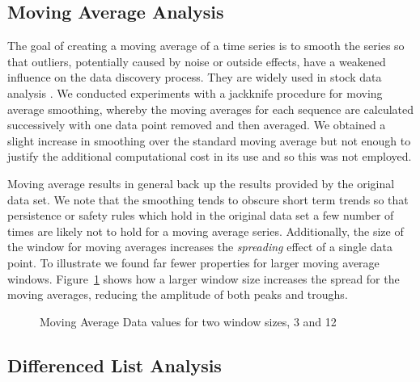 \subsection{Moving Average Analysis}\label{subsec:tr_mav_analysis}

The goal of creating a moving average of a time series is to smooth
the series so that outliers, potentially caused by noise or outside
effects, have a weakened influence on the data discovery
process. They are widely used in stock data analysis \cite{rm97}.
 We conducted experiments with a jackknife procedure for moving
average smoothing, 
whereby the moving averages for each sequence are calculated
successively with one data point removed and then averaged. We obtained a
slight increase in smoothing over the standard moving average but not
enough to justify the additional computational cost in its use and so
this was not employed. 

\smallskip

Moving average results in general back up the results provided by the
original data set. We note that the smoothing tends to obscure short
term trends so that persistence or safety rules which hold in the
original data set a few number of times are likely not to hold for a
moving average series. Additionally, the size of the window for moving
averages increases the {\em spreading} effect of a single data
point. To illustrate we found far fewer properties for larger moving
average windows. Figure~\ref{graph:ma3_12} shows how a larger window
size increases the spread for the moving averages, reducing the
amplitude of both peaks and troughs.


\begin{figure}
\centerline{}
\caption{\label{graph:ma3_12}{Moving Average Data
values for two window sizes, 3 and 12}}
\end{figure}


\subsection{Differenced List Analysis}\label{subsec:tr__diff_analysis}

